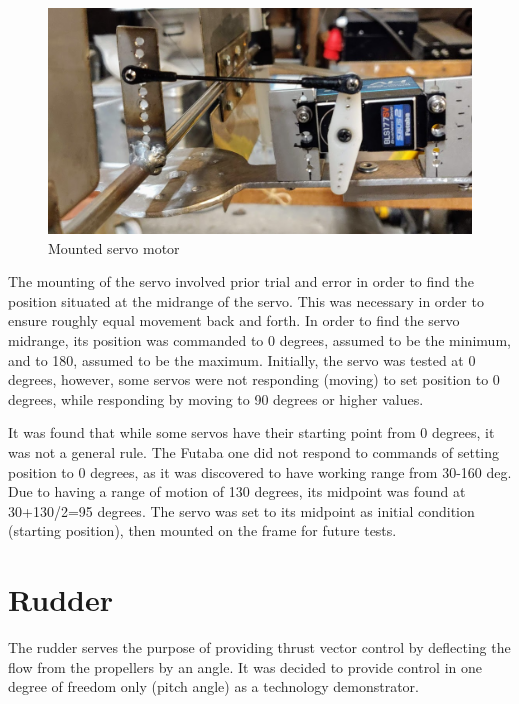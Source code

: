 \begin{figure}[h!]
    \centering
    \includegraphics[scale=0.5]{graphics/Drone/Servo.png}
    \caption{Mounted servo motor}
     \label{fig:Mounted servo motor}
\end{figure}  

 
The mounting of the servo involved prior trial and error in order to find the position situated at the midrange of the servo. This was necessary in order to ensure roughly equal movement back and forth. 
In order to find the servo midrange, its position was commanded to 0 degrees, assumed to be the minimum, and to 180, assumed to be the maximum. 
Initially, the servo was tested at 0 degrees, however, some servos were not responding (moving) to set position to 0 degrees, while responding by moving to 90 degrees or higher values. 
 
It was found that while some servos have their starting point from 0 degrees, it was not a general rule.  The Futaba one did not respond to commands of setting position to 0 degrees, as it was discovered to have working range from 30-160 deg. Due to  having a range of motion of 130 degrees, its midpoint was found at 30+130/2=95 degrees. 
The servo was set to its midpoint as initial condition (starting position), then mounted on the frame for future tests. 
 
\section{Rudder}

The rudder serves the purpose of providing thrust vector control by deflecting the flow from the propellers by an angle. 
It was decided to provide control in one degree of freedom only (pitch angle) as a technology demonstrator. 

